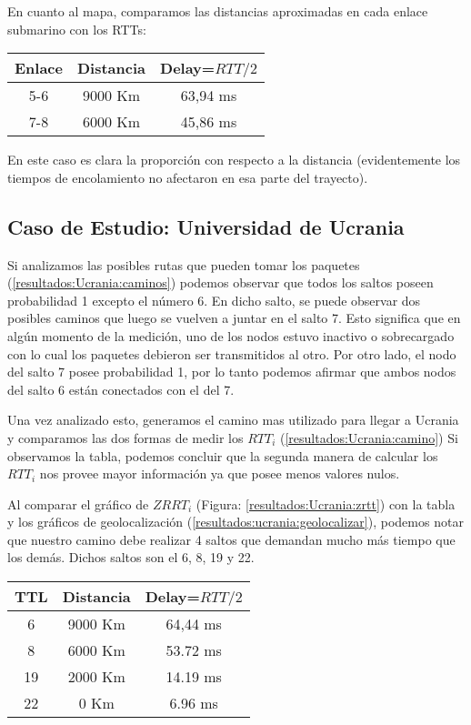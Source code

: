 En cuanto al mapa, comparamos las distancias aproximadas en cada enlace submarino con los RTTs:
\begin{center}
 \begin{tabular}{|c|c|c|}
  \hline
  Enlace & Distancia & Delay=$RTT/2$ \\
  \hline
  5-6   & 9000 Km   & 63,94 ms\\
  \hline
  7-8   & 6000 Km   & 45,86 ms\\
  \hline
 \end{tabular}
\end{center}
En este caso es clara la proporción con respecto a la distancia (evidentemente los tiempos de encolamiento no afectaron en esa parte del trayecto).

\subsection{Caso de Estudio: Universidad de Ucrania}
Si analizamos las posibles rutas que pueden tomar los paquetes (\ref{resultados:Ucrania:caminos}) podemos observar que todos los saltos poseen probabilidad 1 excepto el número 6. En dicho salto, se puede observar dos posibles caminos que luego se vuelven a juntar en el salto 7. Esto significa que en algún momento de la medición, uno de los nodos estuvo inactivo o sobrecargado con lo cual los paquetes debieron ser transmitidos al otro. Por otro lado, el nodo del salto 7 posee probabilidad 1, por lo tanto podemos afirmar que ambos nodos del salto 6 están conectados con el del 7.  

Una vez analizado esto, generamos el camino mas utilizado para llegar a Ucrania y comparamos las dos formas de medir los $RTT_i$ (\ref{resultados:Ucrania:camino}) 
Si observamos la tabla, podemos concluir que la segunda manera de calcular los $RTT_i$ nos provee mayor información ya que posee menos valores nulos.

Al comparar el gráfico de $ZRRT_i$ (Figura: \ref{resultados:Ucrania:zrtt}) con la tabla y los gráficos de geolocalización (\ref{resultados:ucrania:geolocalizar}), podemos notar que nuestro camino debe realizar 4 saltos que demandan mucho más tiempo que los demás. Dichos saltos son el 6, 8, 19 y  22.
\begin{center}
 \begin{tabular}{|c|c|c|}
  \hline
  TTL & Distancia & Delay=$RTT/2$ \\
  \hline
  6   & 9000 Km   & 64,44 ms\\
  \hline
  8   & 6000 Km   & 53.72 ms\\
  \hline
  19   & 2000 Km   & 14.19 ms\\
  \hline
  22   & 0 Km   & 6.96 ms\\
  \hline
 \end{tabular}
\end{center}

